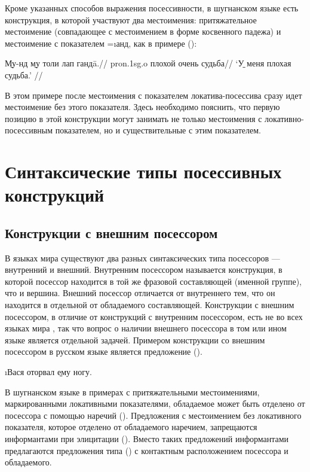 Кроме указанных способов выражения посессивности, в шугнанском языке есть конструкция, в которой участвуют два местоимения: притяжательное местоимение (совпадающее с местоимением в форме косвенного падежа) и местоимение с показателем =\i{анд}, как в примере ():

\begingl
\gla \b{Му-нд} \b{му} толи лап гандā.//
 {\sc pron.1sg.o} плохой очень судьба//
\glft ‘\b{У меня} плохая судьба.’ //
\endgl \xe

В этом примере после местоимения с показателем локатива-посессива сразу идет местоимение без этого показателя. Здесь необходимо пояснить, что первую позицию в этой конструкции могут занимать не только местоимения с локативно-посессивным показателем, но и существительные с этим показателем.

\section{Синтаксические типы посессивных конструкций} \label{poss-syntax}

\subsection{Конструкции с внешним посессором}

В языках мира существуют два разных синтаксических типа посессоров — внутренний и внешний. Внутренним посессором называется конструкция, в которой посессор находится в той же фразовой составляющей (именной группе), что и вершина. Внешний посессор отличается от внутреннего тем, что он находится в отдельной от обладаемого составляющей. Конструкции с внешним посессором, в отличие от конструкций с внутренним посессором, есть не во всех языках мира \parencite[591]{koenig_haspelmath1997}, так что вопрос о наличии внешнего посессора в том или ином языке является отдельной задачей. Примером конструкции со внешним посессором в русском языке является предложение ().

\i{Вася оторвал \b{ему} ногу.}
\xe

В шугнанском языке в примерах с притяжательными местоимениями, маркированными локативными показателями, обладаемое может быть отделено от посессора с помощью наречий (). Предложения с местоимением без локативного показателя, которое отделено от обладаемого наречием, запрещаются информантами при элицитации (). Вместо таких предложений информантами предлагаются предложения типа () с контактным расположением посессора и обладаемого.

